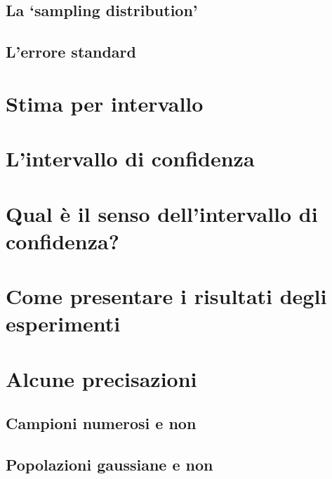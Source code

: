 \documentclass[a4paper,12pt,oneside]{book}
\begin{document}
\hypertarget{la-sampling-distribution}{%
\subsection{La `sampling distribution'}\label{la-sampling-distribution}}

\hypertarget{lerrore-standard}{%
\subsection{L'errore standard}\label{lerrore-standard}}

\hypertarget{stima-per-intervallo}{%
\section{Stima per intervallo}\label{stima-per-intervallo}}

\hypertarget{lintervallo-di-confidenza}{%
\section{L'intervallo di confidenza}\label{lintervallo-di-confidenza}}

\hypertarget{qual-uxe8-il-senso-dellintervallo-di-confidenza}{%
\section{Qual è il senso dell'intervallo di confidenza?}\label{qual-uxe8-il-senso-dellintervallo-di-confidenza}}

\hypertarget{come-presentare-i-risultati-degli-esperimenti}{%
\section{Come presentare i risultati degli esperimenti}\label{come-presentare-i-risultati-degli-esperimenti}}

\hypertarget{alcune-precisazioni}{%
\section{Alcune precisazioni}\label{alcune-precisazioni}}

\hypertarget{campioni-numerosi-e-non}{%
\subsection{Campioni numerosi e non}\label{campioni-numerosi-e-non}}

\hypertarget{popolazioni-gaussiane-e-non}{%
\subsection{Popolazioni gaussiane e non}\label{popolazioni-gaussiane-e-non}}
\end{document}
